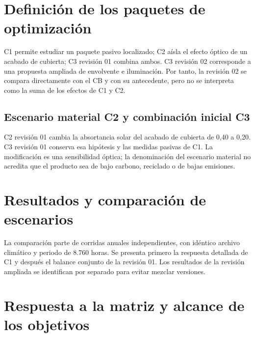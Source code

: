 \section{Definición de los paquetes de optimización}
\begin{textoDosTercios}
C1 permite estudiar un paquete pasivo localizado; C2 aísla el efecto óptico de un acabado de cubierta; C3 revisión 01 combina ambos. C3 revisión 02 corresponde a una propuesta ampliada de envolvente e iluminación. Por tanto, la revisión 02 se compara directamente con el CB y con su antecedente, pero no se interpreta como la suma de los efectos de C1 y C2.
\end{textoDosTercios}

\par\medskip
\subsection{Escenario material C2 y combinación inicial C3}
C2 revisión 01 cambia la absortancia solar del acabado de cubierta de 0,40 a 0,20. C3 revisión 01 conserva esa hipótesis y las medidas pasivas de C1. La modificación es una sensibilidad óptica; la denominación del escenario material no acredita que el producto sea de bajo carbono, reciclado o de bajas emisiones.


\section{Resultados y comparación de escenarios}
\begin{textoDosTercios}
La comparación parte de corridas anuales independientes, con idéntico archivo climático y periodo de 8.760 horas. Se presenta primero la respuesta detallada de C1 y después el balance conjunto de la revisión 01. Los resultados de la revisión ampliada se identifican por separado para evitar mezclar versiones.
\end{textoDosTercios}









\par\medskip
\section{Respuesta a la matriz y alcance de los objetivos}


